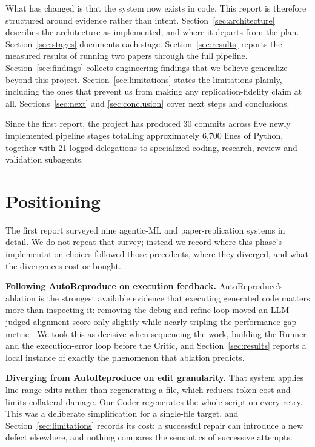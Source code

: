 \documentclass[10pt,twocolumn]{article}
\begin{document}
What has changed is that the system now exists in code. This report is therefore
structured around evidence rather than intent. Section~\ref{sec:architecture} describes
the architecture as implemented, and where it departs from the plan.
Section~\ref{sec:stages} documents each stage. Section~\ref{sec:results} reports the
measured results of running two papers through the full pipeline.
Section~\ref{sec:findings} collects engineering findings that we believe generalize
beyond this project. Section~\ref{sec:limitations} states the limitations plainly,
including the ones that prevent us from making any replication-fidelity claim at all.
Sections~\ref{sec:next} and \ref{sec:conclusion} cover next steps and conclusions.

Since the first report, the project has produced 30 commits across five newly implemented
pipeline stages totalling approximately 6{,}700 lines of Python, together with 21 logged
delegations to specialized coding, research, review and validation subagents.


\section{Positioning}
\label{sec:related}

The first report surveyed nine agentic-ML and paper-replication systems in detail. We do
not repeat that survey; instead we record where this phase's implementation choices
followed those precedents, where they diverged, and what the divergences cost or bought.

\textbf{Following AutoReproduce on execution feedback.} AutoReproduce's ablation is the
strongest available evidence that executing generated code matters more than inspecting
it: removing the debug-and-refine loop moved an LLM-judged alignment score only slightly
while nearly tripling the performance-gap metric \cite{zhao2025autoreproduce}. We took
this as decisive when sequencing the work, building the Runner and the execution-error
loop before the Critic, and Section~\ref{sec:results} reports a local instance of exactly
the phenomenon that ablation predicts.

\textbf{Diverging from AutoReproduce on edit granularity.} That system applies
line-range edits rather than regenerating a file, which reduces token cost and limits
collateral damage. Our Coder regenerates the whole script on every retry. This was a
deliberate simplification for a single-file target, and Section~\ref{sec:limitations}
records its cost: a successful repair can introduce a new defect elsewhere, and nothing
compares the semantics of successive attempts.
\end{document}
